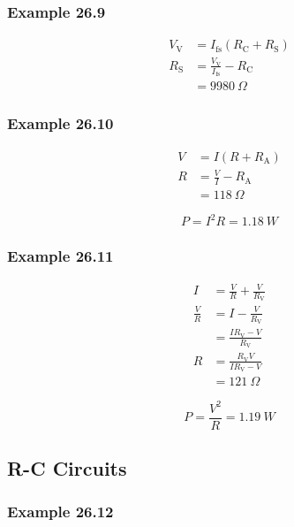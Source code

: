 \documentclass{article}
\begin{document}
\subsubsection{Example 26.9}

\begin{align*}
  V_\textrm{V} & = I_\textrm{fs} (R_\textrm{C} + R_\textrm{S})       \\
  R_\textrm{S} & = \frac{V_\textrm{V}}{I_\textrm{fs}} - R_\textrm{C} \\
               & = \qty{9980}{\Omega}
\end{align*}

\subsubsection{Example 26.10}

\begin{align*}
  V & = I (R + R_\textrm{A})       \\
  R & = \frac{V}{I} - R_\textrm{A} \\
    & = \qty{118}{\Omega}
\end{align*}

\[P = I^2 R = \qty{1.18}{W}\]

\subsubsection{Example 26.11}

\begin{align*}
  I           & = \frac{V}{R} + \frac{V}{R_\textrm{V}}      \\
  \frac{V}{R} & = I - \frac{V}{R_\textrm{V}}                \\
              & = \frac{I R_\textrm{V} - V}{R_\textrm{V}}   \\
  R           & = \frac{R_\textrm{V} V}{I R_\textrm{V} - V} \\
              & = \qty{121}{\Omega}
\end{align*}

\[P = \frac{V^2}{R} = \qty{1.19}{W}\]

\subsection{R-C Circuits}

\subsubsection{Example 26.12}
\end{document}
